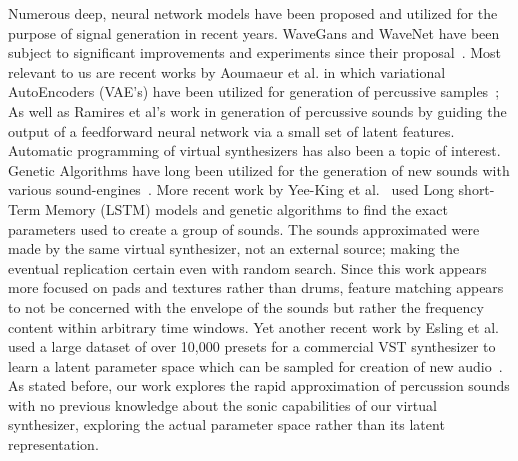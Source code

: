 \documentclass[\main/thesis.tex]{subfiles}
\begin{document}
\begin{center}
\begin{table}[h*]
\hline
\caption{Quick reference for related works}
\end{table}
\end{center}
Numerous deep, neural network models have been proposed and utilized for the purpose of signal generation in recent years. WaveGans and WaveNet have been subject to significant improvements and experiments since their proposal~\cite{nsynth2017,yamamoto2020parallel,oord2017parallel}. Most relevant to us are recent works by Aoumaeur et al. in which variational AutoEncoders (VAE's) have been utilized for generation of percussive samples~\cite{aouameur2019neural}; As well as Ramires et al's work in generation of percussive sounds by guiding the output of a feedforward neural network via a small set of latent features. 
Automatic programming of virtual synthesizers has also been a topic of interest. Genetic Algorithms have long been utilized for the generation of new sounds with various sound-engines~\cite{johnson1999exploring,dahlstedt2001creating,hornermachinetongues,macret2012automatic}. More recent work by Yee-King et al.~\cite{yee2018automatic} used Long short-Term Memory (LSTM) models and genetic algorithms to find the exact parameters used to create a group of sounds. The sounds approximated were made by the same virtual synthesizer, not an external source; making the eventual replication certain even with random search. Since this work appears more focused on pads and textures rather than drums, feature matching appears to not be concerned with the envelope of the sounds but rather the frequency content within arbitrary time windows. Yet another recent work by Esling et al. used a large dataset of over 10,000 presets for a commercial VST synthesizer to learn a latent parameter space which can be sampled for creation of new audio~\cite{esling2019universal}. As stated before, our work explores the rapid approximation of percussion sounds with no previous knowledge about the sonic capabilities of our virtual synthesizer, exploring the actual parameter space rather than its latent representation.

 
\end{document}
